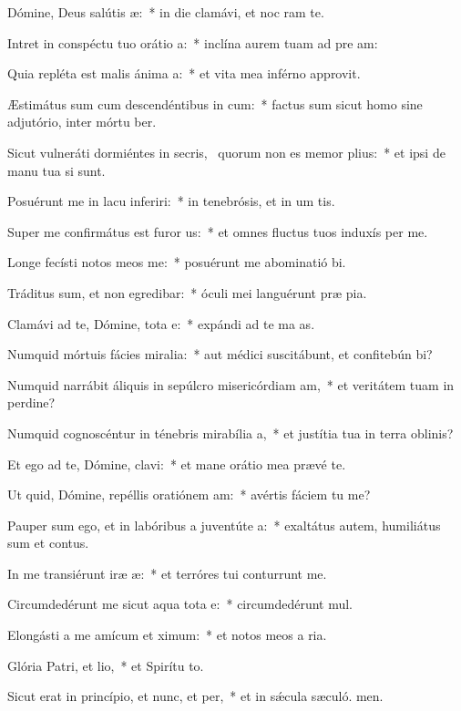 \item Dómine, Deus salútis æ:~* in die clamávi, et noc ram te.
\item Intret in conspéctu tuo orátio a:~* inclína aurem tuam ad pre am:
\item Quia repléta est malis ánima a:~* et vita mea inférno approvit.
\item Æstimátus sum cum descendéntibus in cum:~* factus sum sicut homo sine adjutório, inter mórtu ber.
\item Sicut vulneráti dormiéntes in secris,~\pscross{} quorum non es memor plius:~* et ipsi de manu tua si sunt.
\item Posuérunt me in lacu inferiri:~* in tenebrósis, et in um tis.
\item Super me confirmátus est furor us:~* et omnes fluctus tuos induxís per me.
\item Longe fecísti notos meos  me:~* posuérunt me abominatió bi.
\item Tráditus sum, et non egredibar:~* óculi mei languérunt præ pia.
\item Clamávi ad te, Dómine, tota e:~* expándi ad te ma as.
\item Numquid mórtuis fácies miralia:~* aut médici suscitábunt, et confitebún bi?
\item Numquid narrábit áliquis in sepúlcro misericórdiam am,~* et veritátem tuam in perdine?
\item Numquid cognoscéntur in ténebris mirabília a,~* et justítia tua in terra oblinis?
\item Et ego ad te, Dómine, clavi:~* et mane orátio mea prævé te.
\item Ut quid, Dómine, repéllis oratiónem am:~* avértis fáciem tu  me?
\item Pauper sum ego, et in labóribus a juventúte a:~* exaltátus autem, humiliátus sum et contus.
\item In me transiérunt iræ æ:~* et terróres tui conturrunt me.
\item Circumdedérunt me sicut aqua tota e:~* circumdedérunt  mul.
\item Elongásti a me amícum et ximum:~* et notos meos a ria.
\item Glória Patri, et lio,~* et Spirítu to.
\item Sicut erat in princípio, et nunc, et per,~* et in sǽcula sæculó. men.
